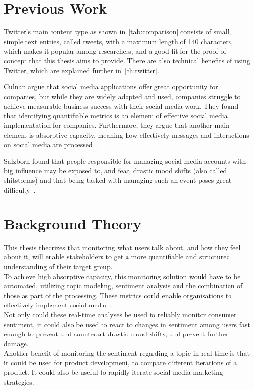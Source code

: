 \section{Previous Work}
\label{sec:previousWork}

Twitter's main content type as shown in~\cref{tab:comparison} consists of small, simple text entries, called tweets, with a maximum length of 140 characters,
which makes it popular among researchers, and a good fit for the proof of concept that this thesis aims to provide.
There are also technical benefits of using Twitter, which are explained further in~\cref{ch:twitter}.

Culnan \etAl argue that social media applications offer great opportunity for companies,
but while they are widely adopted and used,
companies struggle to achieve measurable business success with their social media work.
They found that identifying quantifiable metrics is an element of effective social media implementation for companies.
Furthermore, they argue that another main element is absorptive capacity, meaning how effectively messages and
interactions on social media are processed~\cite{Culnan2015}.

Salzborn \etAl found that people responsible for managing social-media accounts with big influence may be exposed to, and fear,
drastic mood shifts (also called shitstorms) and that being tasked with managing such an event poses great difficulty~\cite{Salzborn2015}.

\section{Background Theory}
\label{sec:backgroundTheory}

This thesis theorizes that monitoring what users talk about,
and how they feel about it, will enable stakeholders to get a more quantifiable and structured understanding of their target group.\\
To achieve high absorptive capacity, this monitoring solution would have to be automated,
utilizing topic modeling, sentiment analysis and the combination of those as part of the processing.
These metrics could enable organizations to effectively implement social media~\cite{Culnan2015}.\\
Not only could these real-time analyses be used to reliably monitor consumer sentiment,
it could also be used to react to changes in sentiment among users fast enough to prevent and counteract
drastic mood shifts, and prevent further damage.\\
Another benefit of monitoring the sentiment regarding a topic in real-time is that it could be used for product development,
to compare different iterations of a product.
It could also be useful to rapidly iterate social media marketing strategies.
